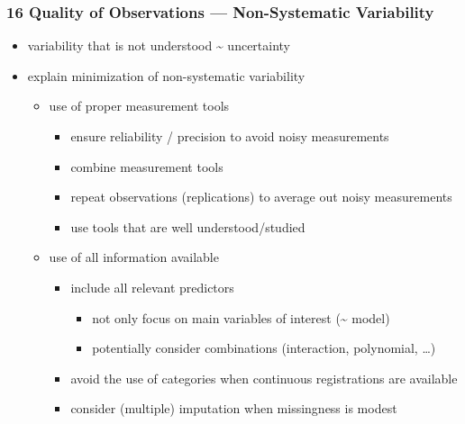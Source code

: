 \documentclass[
]{article}
\providecommand{\tightlist}{%
  \setlength{\itemsep}{0pt}\setlength{\parskip}{0pt}}
\begin{document}
\hypertarget{quality-of-observations-non-systematic-variability}{%
\subsubsection{16 Quality of Observations --- Non-Systematic
Variability}\label{quality-of-observations-non-systematic-variability}}

\begin{itemize}
\tightlist
\item
  variability that is not understood \textasciitilde{} uncertainty
\item
  explain minimization of non-systematic variability

  \begin{itemize}
  \tightlist
  \item
    use of proper measurement tools

    \begin{itemize}
    \tightlist
    \item
      ensure reliability / precision to avoid noisy measurements
    \item
      combine measurement tools
    \item
      repeat observations (replications) to average out noisy
      measurements
    \item
      use tools that are well understood/studied
    \end{itemize}
  \item
    use of all information available

    \begin{itemize}
    \tightlist
    \item
      include all relevant predictors

      \begin{itemize}
      \tightlist
      \item
        not only focus on main variables of interest (\textasciitilde{}
        model)
      \item
        potentially consider combinations (interaction, polynomial,
        \ldots)
      \end{itemize}
    \item
      avoid the use of categories when continuous registrations are
      available
    \item
      consider (multiple) imputation when missingness is modest
    \end{itemize}
  \end{itemize}
\end{itemize}
\end{document}
